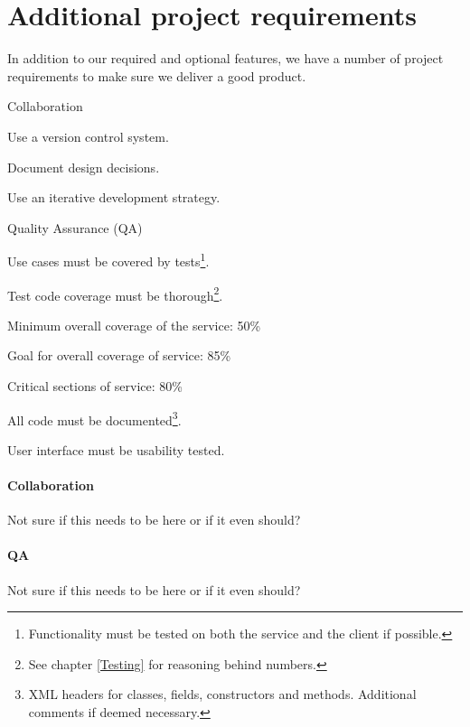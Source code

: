 \section{Additional project requirements}
\label{Requirements_Additional}
In addition to our required and optional features, we have a number of project requirements to make sure we deliver a good product. 
\begin{my_itemize}
	\item Collaboration 
	\begin{my_itemize}
		\item Use a version control system.
		\item Document design decisions.
		\item Use an iterative development strategy.
	\end{my_itemize}
	\item Quality Assurance (QA)
	\begin{my_itemize}
		\item Use cases must be covered by tests\footnote{Functionality must be tested on both the service and the client if possible.}.
		\item Test code coverage must be thorough\footnote{See chapter \ref{Testing}  for reasoning behind	numbers.}.
		\begin{my_itemize}
			\item Minimum overall coverage of the service: 50\%
			\item Goal for overall coverage of service: 85\%
			\item Critical sections of service: 80\%
		\end{my_itemize}
		\item All code must be documented\footnote{XML headers for classes, fields, constructors and methods. Additional comments if deemed necessary.}.
		\item User interface must be usability tested.
	\end{my_itemize}
\end{my_itemize}

\paragraph{Collaboration}
Not sure if this needs to be here or if it even should?

\paragraph{QA}
Not sure if this needs to be here or if it even should?


